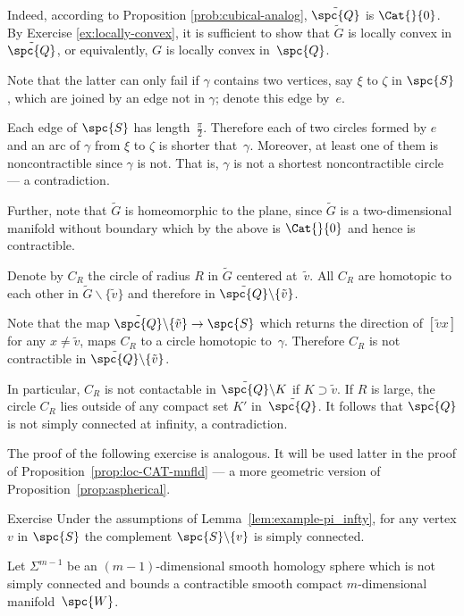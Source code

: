 Indeed, according to Proposition \ref{prob:cubical-analog},
$\tilde{\spc{Q}}$ is $\Cat{}{0}$.
By Exercise \ref{ex:locally-convex},
it is sufficient to show that $\tilde G$ is locally convex in $\tilde{\spc{Q}}$,
or equivalently, $G$ is locally convex in~$\spc{Q}$.

Note that the latter can only fail if $\gamma$ contains two vertices, say $\xi$ to $\zeta$ in $\spc{S}$,
which are joined by an edge not in $\gamma$; 
denote this edge by~$e$.

Each edge of $\spc{S}$ has length~$\tfrac\pi2$.
Therefore each of two circles formed by $e$ and an arc of $\gamma$
from $\xi$ to $\zeta$ is shorter that~$\gamma$.
Moreover,
at least one of them is noncontractible 
since $\gamma$ is not.
That is, 
$\gamma$ is not a shortest noncontractible circle 
--- a contradiction.
\claimqeds

Further, note that 
$\tilde G$ is homeomorphic to the plane, 
since $\tilde G$ is 
a two-dimensional manifold without boundary which 
by the above is $\Cat{}{0}$ and hence is contractible.

Denote by $C_R$ the circle of radius $R$ in $\tilde G$ centered at~$\tilde v$.
All $C_R$ are homotopic to each other in $\tilde G\backslash\{\tilde v\}$ and therefore in $\tilde{\spc{Q}}\backslash \{\tilde v\}$.

Note that the map $\tilde{\spc{Q}}\backslash \{\tilde v\}\to \spc{S}$
which returns the direction of $[{\tilde v}{x}]$  for any $x\ne \tilde v$, maps $C_R$ to a circle homotopic to~$\gamma$.
Therefore $C_R$ is not contractible in $\tilde{\spc{Q}}\backslash \{\tilde v\}$.

In particular, 
$C_R$ is not contactable in $\tilde{\spc{Q}}\backslash K$
if $K\supset \tilde v$.
If $R$ is large, 
the circle $C_R$  
lies outside of any compact set $K'$ in~$\tilde{\spc{Q}}$.
It follows that $\tilde{\spc{Q}}$ is not simply connected at infinity, a contradiction.
\qeds

The proof of the following exercise is analogous.
It will be used latter in the proof of Proposition~\ref{prop:loc-CAT-mnfld} --- a more geometric version of Proposition~\ref{prop:aspherical}.

\begin{thm}{Exercise}\label{ex:example-pi_infty-new}
Under the assumptions of Lemma~\ref{lem:example-pi_infty}, 
for any vertex $v$ in $\spc{S}$
the complement $\spc{S}\backslash\{v\}$ is simply connected.
\end{thm}

Let $\Sigma^{m-1}$ be an $(m-1)$-dimensional smooth homology sphere which is not simply connected and bounds a contractible smooth compact $m$-dimensional manifold~$\spc{W}$. 

